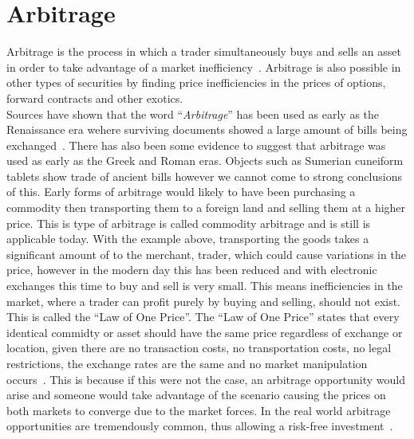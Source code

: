 \section{Arbitrage}
Arbitrage is the process in which a trader simultaneously buys and sells an asset in order to take advantage of a market inefficiency~\cite{businessinsightsblog_2021}. Arbitrage is also possible in other types of securities by finding price inefficiencies in the prices of options, forward contracts and other exotics.
\\[5mm]
Sources have shown that the word ``\textit{Arbitrage}'' has been used as early as the Renaissance era wehere surviving documents showed a large amount of bills being exchanged~\cite{poitras_2021}. There has also been some evidence to suggest that arbitrage was used as early as the Greek and Roman eras. Objects such as Sumerian cuneiform tablets show trade of ancient bills however we cannot come to strong conclusions of this. Early forms of arbitrage would likely to have been purchasing a commodity then transporting them to a foreign land and selling them at a higher price. This is type of arbitrage is called commodity arbitrage and is still is applicable today. With the example above, transporting the goods takes a significant amount of to the merchant, trader, which could cause variations in the price, however in the modern day this has been reduced and with electronic exchanges this time to buy and sell is very small. This means inefficiencies in the market, where a trader can profit purely by buying and selling, should not exist. This is called the ``Law of One Price''. The ``Law of One Price'' states that every identical commidty or asset should have the same price regardless of exchange or location, given there are no transaction costs, no transportation costs, no legal restrictions, the exchange rates are the same and no market manipulation occurs~\cite{noauthor_law_nodate}. This is because if this were not the case, an arbitrage opportunity would arise and someone would take advantage of the scenario causing the prices on both markets to converge due to the market forces. In the real world arbitrage opportunities are tremendously common, thus allowing a risk-free investment~\cite{10.2307/1828075, RICHARDSON1978341}.
\\[5mm]
